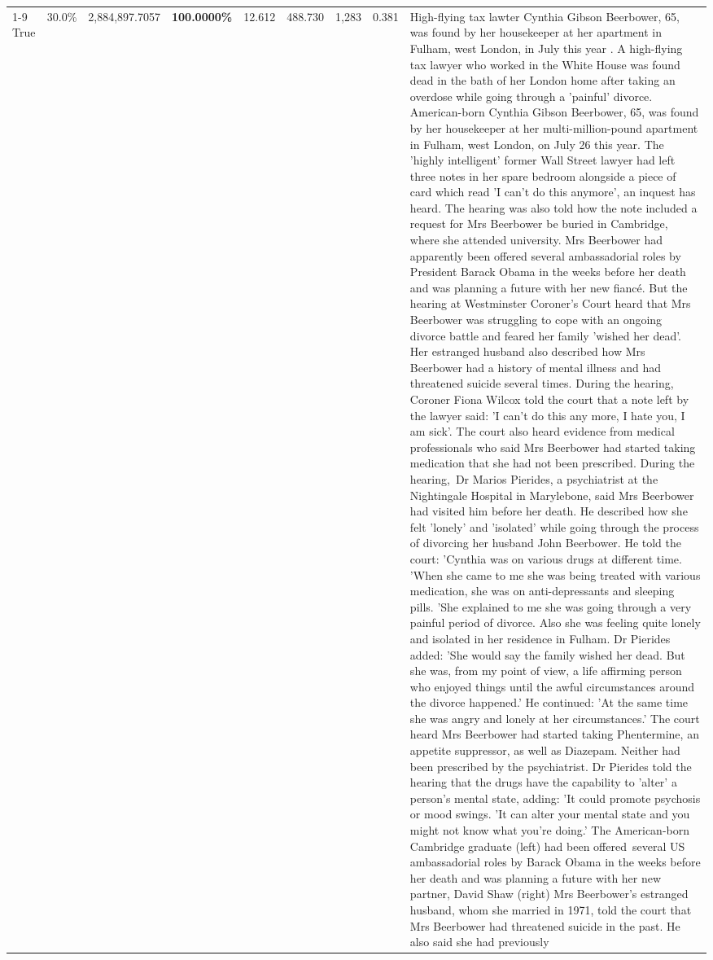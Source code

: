 \begin{table}[H]
\begin{tabular}{lllrlllll}
\cline{1-9}
True & 30.0\% & 2,884,897.7057 & \bfseries \color{red} 100.0000\% & 12.612 & 488.730 & 1,283 & 0.381 & High-flying tax lawter Cynthia Gibson Beerbower, 65, was found by her housekeeper at her apartment in Fulham, west London, in July this year . A high-flying tax lawyer who worked in the White House was found dead in the bath of her London home after taking an overdose while going through a 'painful' divorce. American-born Cynthia Gibson Beerbower, 65, was found by her housekeeper at her multi-million-pound apartment in Fulham, west London, on July 26 this year. The 'highly intelligent' former Wall Street lawyer had left three notes in her spare bedroom alongside a piece of card which read 'I can't do this anymore', an inquest has heard. The hearing was also told how the note included a request for Mrs Beerbower be buried in Cambridge, where she attended university. Mrs Beerbower had apparently been offered several ambassadorial roles by President Barack Obama in the weeks before her death and was planning a future with her new fiancé. But the hearing at Westminster Coroner's Court heard that Mrs Beerbower was struggling to cope with an ongoing divorce battle and feared her family 'wished her dead'. Her estranged husband also described how Mrs Beerbower had a history of mental illness and had threatened suicide several times. During the hearing, Coroner Fiona Wilcox told the court that a note left by the lawyer said: 'I can't do this any more, I hate you, I am sick'. The court also heard evidence from medical professionals who said Mrs Beerbower had started taking medication that she had not been prescribed. During the hearing, Dr Marios Pierides, a psychiatrist at the Nightingale Hospital in Marylebone, said Mrs Beerbower had visited him before her death. He described how she felt 'lonely' and 'isolated' while going through the process of divorcing her husband John Beerbower. He told the court: 'Cynthia was on various drugs at different time. 'When she came to me she was being treated with various medication, she was on anti-depressants and sleeping pills. 'She explained to me she was going through a very painful period of divorce. Also she was feeling quite lonely and isolated in her residence in Fulham. Dr Pierides added: 'She would say the family wished her dead. But she was, from my point of view, a life affirming person who enjoyed things until the awful circumstances around the divorce happened.' He continued: 'At the same time she was angry and lonely at her circumstances.' The court heard Mrs Beerbower had started taking Phentermine, an appetite suppressor, as well as Diazepam. Neither had been prescribed by the psychiatrist. Dr Pierides told the hearing that the drugs have the capability to 'alter' a person's mental state, adding: 'It could promote psychosis or mood swings. 'It can alter your mental state and you might not know what you're doing.' The American-born Cambridge graduate (left) had been offered several US ambassadorial roles by Barack Obama in the weeks before her death and was planning a future with her new partner, David Shaw (right) Mrs Beerbower's estranged husband, whom she married in 1971, told the court that Mrs Beerbower had threatened suicide in the past. He also said she had previously 
\end{tabular}
\end{table}
